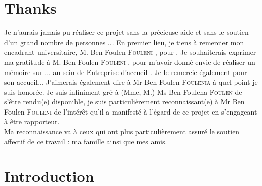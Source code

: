 \documentclass[a4paper, oneside, french, 12pt, final]{extreport}
\newcommand{\studyDepartment} {%
  Entreprise d'accueil %
}
\newcommand{\juryPresident} {%
  Mr Ben Foulen \textsc{Foulenia}%
}
\newcommand{\juryMemberOne} {%
  Ms Ben Foulena \textsc{Foulen}%
}
\newcommand{\juryMemberTwo} {%
  Mr Ben Foulen \textsc{Fouleni}%
}
\newcommand{\juryMemberThree} {%
	M. Ben Foulen \textsc{Fouleni}%
}
\newcommand{\juryMemberFour} {%
	M. Ben Foulen \textsc{Fouleni}%
}
\begin{document}
\chapter*{Thanks}
\thispagestyle{empty}

Je n'aurais jamais pu réaliser ce projet sans la précieuse aide et sans le soutien d'un grand nombre de personnes ... En premier lieu, je tiens à remercier mon encadrant universitaire, \juryMemberFour{}, pour . Je souhaiterais exprimer ma gratitude à \juryMemberThree{}, pour m’avoir donné envie de réaliser un mémoire sur ... au sein de \studyDepartment. Je le remercie également pour son accueil... J'aimerais également dire à \juryPresident{} à quel point je suis honorée. Je suis infiniment gré à (Mme, M.) \juryMemberOne{} de s’être rendu(e) disponible, je suis particulièrement reconnaissant(e) à \juryMemberTwo{} de l’intérêt qu’il a manifesté à l’égard de ce projet en s’engageant à être rapporteur. \\

Ma reconnaissance va à ceux qui ont plus particulièrement assuré le soutien affectif de ce travail : ma famille ainsi que mes amis. 

\tableofcontents
{}
\cleardoublepage%

\listoffigures
\cleardoublepage%

\listoftables
\cleardoublepage

\listofalgorithms
{}
\cleardoublepage
    








\chapter*{Introduction}
\label{chap:general_intorduction}
%
\end{document}
